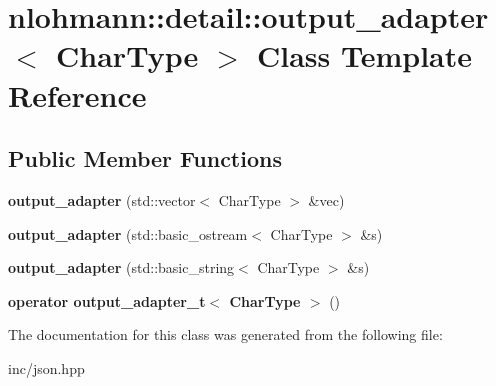 \hypertarget{classnlohmann_1_1detail_1_1output__adapter}{}\section{nlohmann\+:\+:detail\+:\+:output\+\_\+adapter$<$ Char\+Type $>$ Class Template Reference}
\label{classnlohmann_1_1detail_1_1output__adapter}
\subsection*{Public Member Functions}
\begin{DoxyCompactItemize}
\item 
{\bfseries output\+\_\+adapter} (std\+::vector$<$ Char\+Type $>$ \&vec)\hypertarget{classnlohmann_1_1detail_1_1output__adapter_a117bda35bc3de85fd2f5f2153d9705b4}{}\label{classnlohmann_1_1detail_1_1output__adapter_a117bda35bc3de85fd2f5f2153d9705b4}

\item 
{\bfseries output\+\_\+adapter} (std\+::basic\+\_\+ostream$<$ Char\+Type $>$ \&s)\hypertarget{classnlohmann_1_1detail_1_1output__adapter_ac086bc101f246eb815e46f17a9e68a4a}{}\label{classnlohmann_1_1detail_1_1output__adapter_ac086bc101f246eb815e46f17a9e68a4a}

\item 
{\bfseries output\+\_\+adapter} (std\+::basic\+\_\+string$<$ Char\+Type $>$ \&s)\hypertarget{classnlohmann_1_1detail_1_1output__adapter_a07f996a817ffb420022cea56425f7d5c}{}\label{classnlohmann_1_1detail_1_1output__adapter_a07f996a817ffb420022cea56425f7d5c}

\item 
{\bfseries operator output\+\_\+adapter\+\_\+t$<$ Char\+Type $>$} ()\hypertarget{classnlohmann_1_1detail_1_1output__adapter_adee7a0e124f483d9945b8b85c73d7957}{}\label{classnlohmann_1_1detail_1_1output__adapter_adee7a0e124f483d9945b8b85c73d7957}

\end{DoxyCompactItemize}


The documentation for this class was generated from the following file\+:\begin{DoxyCompactItemize}
\item 
inc/json.\+hpp\end{DoxyCompactItemize}
